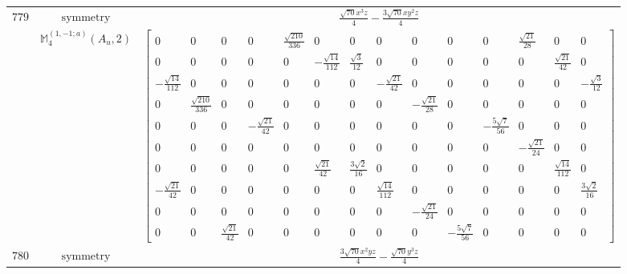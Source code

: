 \documentclass[fleqn,8pt,landscape]{jsarticle}
\begin{document}
\begin{longtable}{ccc}
$ 779 $ & $ \text{symmetry} $ & $ \frac{\sqrt{70} x^{3} z}{4} - \frac{3 \sqrt{70} x y^{2} z}{4} $ \\
$  $ & $ \mathbb{M}_{4}^{(1,-1;a)}(A_{u},2) $ & $ \begin{bmatrix} 0 & 0 & 0 & 0 & \frac{\sqrt{210}}{336} & 0 & 0 & 0 & 0 & 0 & 0 & \frac{\sqrt{21}}{28} & 0 & 0 \\ 0 & 0 & 0 & 0 & 0 & - \frac{\sqrt{14}}{112} & \frac{\sqrt{3}}{12} & 0 & 0 & 0 & 0 & 0 & \frac{\sqrt{21}}{42} & 0 \\ - \frac{\sqrt{14}}{112} & 0 & 0 & 0 & 0 & 0 & 0 & - \frac{\sqrt{21}}{42} & 0 & 0 & 0 & 0 & 0 & - \frac{\sqrt{3}}{12} \\ 0 & \frac{\sqrt{210}}{336} & 0 & 0 & 0 & 0 & 0 & 0 & - \frac{\sqrt{21}}{28} & 0 & 0 & 0 & 0 & 0 \\ 0 & 0 & 0 & - \frac{\sqrt{21}}{42} & 0 & 0 & 0 & 0 & 0 & 0 & - \frac{5 \sqrt{7}}{56} & 0 & 0 & 0 \\ 0 & 0 & 0 & 0 & 0 & 0 & 0 & 0 & 0 & 0 & 0 & - \frac{\sqrt{21}}{24} & 0 & 0 \\ 0 & 0 & 0 & 0 & 0 & \frac{\sqrt{21}}{42} & \frac{3 \sqrt{2}}{16} & 0 & 0 & 0 & 0 & 0 & \frac{\sqrt{14}}{112} & 0 \\ - \frac{\sqrt{21}}{42} & 0 & 0 & 0 & 0 & 0 & 0 & \frac{\sqrt{14}}{112} & 0 & 0 & 0 & 0 & 0 & \frac{3 \sqrt{2}}{16} \\ 0 & 0 & 0 & 0 & 0 & 0 & 0 & 0 & - \frac{\sqrt{21}}{24} & 0 & 0 & 0 & 0 & 0 \\ 0 & 0 & \frac{\sqrt{21}}{42} & 0 & 0 & 0 & 0 & 0 & 0 & - \frac{5 \sqrt{7}}{56} & 0 & 0 & 0 & 0 \end{bmatrix} $ \\ \hline
$ 780 $ & $ \text{symmetry} $ & $ \frac{3 \sqrt{70} x^{2} y z}{4} - \frac{\sqrt{70} y^{3} z}{4} $ \\

\end{longtable}
\end{document}
